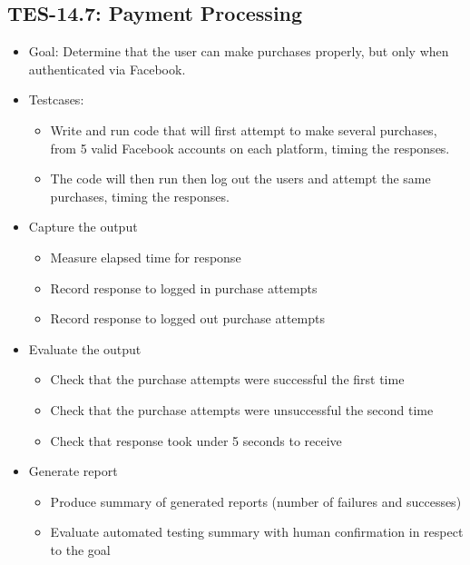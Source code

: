 \subsection{TES-14.7: Payment Processing}
\begin{itemize}
\item Goal: Determine that the user can make purchases properly, but only 
when authenticated via Facebook.

\item Testcases: 
\begin{itemize}
\item Write and run code that will first attempt to make several purchases, 
from 5 valid Facebook accounts on each platform, timing the responses.
\item The code will then run then log out the users and attempt the same 
purchases, timing the responses.
\end{itemize}

\item Capture the output 
\begin{itemize}
\item Measure elapsed time for response
\item Record response to logged in purchase attempts
\item Record response to logged out purchase attempts
\end{itemize}

\item Evaluate the output 
\begin{itemize}
\item Check that the purchase attempts were successful the first time
\item Check that the purchase attempts were unsuccessful the second time
\item Check that response took under 5 seconds to receive
\end{itemize}

\item Generate report 
\begin{itemize}
\item Produce summary of generated reports (number of failures and successes)
\item Evaluate automated testing summary with human confirmation in respect to the goal
\end{itemize}
\end{itemize}

